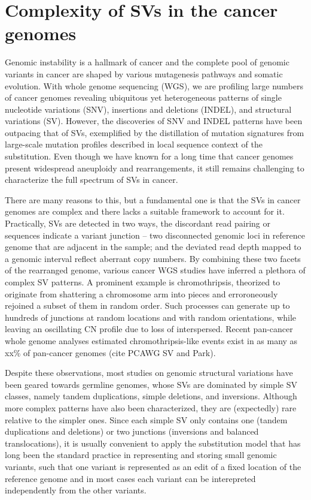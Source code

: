 \documentclass[phd,tocprelim]{cornell}
\begin{document}
\section{Complexity of SVs in the cancer genomes}
Genomic instability is a hallmark of cancer and the complete pool of genomic variants in cancer are shaped by various mutagenesis pathways and somatic evolution. With whole genome sequencing (WGS), we are profiling large numbers of cancer genomes revealing ubiquitous yet heterogeneous patterns of single nucleotide variations (SNV), insertions and deletions (INDEL), and structural variations (SV). However, the discoveries of SNV and INDEL patterns have been outpacing that of SVs, exemplified by the distillation of mutation signatures from large-scale mutation profiles described in local sequence context of the substitution. Even though we have known for a long time that cancer genomes present widespread aneuploidy and rearrangements, it still remains challenging to characterize the full spectrum of SVs in cancer.

There are many reasons to this, but a fundamental one is that the SVs in cancer genomes are complex and there lacks a suitable framework to account for it. Practically, SVs are detected in two ways, the discordant read pairing or sequences indicate a variant junction -- two disconnected genomic loci in reference genome that are adjacent in the sample; and the deviated read depth mapped to a genomic interval reflect aberrant copy numbers. By combining these two facets of the rearranged genome, various cancer WGS studies have inferred a plethora of complex SV patterns. A prominent example is chromothripsis, theorized to originate from shattering a chromosome arm into pieces and erroroneously rejoined a subset of them in random order. Such processes can generate up to hundreds of junctions at random locations and with random orientations, while leaving an oscillating CN profile due to loss of interspersed. Recent pan-cancer whole genome analyses estimated chromothripsis-like events exist in as many as xx\% of pan-cancer genomes (cite PCAWG SV and Park).

Despite these observations, most studies on genomic structural variations have been geared towards germline genomes, whose SVs are dominated by simple SV classes, namely tandem duplications, simple deletions, and inversions. Although more complex patterns have also been characterized, they are (expectedly) rare relative to the simpler ones. Since each simple SV only contains one (tandem duplications and deletions) or two junctions (inversions and balanced translocations), it is usually convenient to apply the substitution model that has long been the standard practice in representing and storing small genomic variants, such that one variant is represented as an edit of a fixed location of the reference genome and in most cases each variant can be interepreted independently from the other variants.
\end{document}
